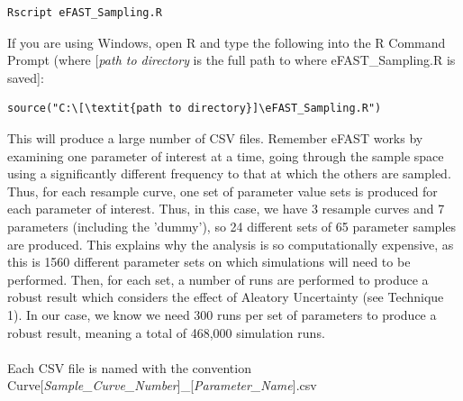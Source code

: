 \documentclass[a4paper,11pt]{article}
\begin{document}
\begin{enumerate}
\begin{verbatim}
Rscript eFAST_Sampling.R
\end{verbatim}

If you are using Windows, open R and type the following into the R Command Prompt (where [\textit{path to directory} is the full path to where eFAST\_Sampling.R is saved]:

\begin{verbatim}
source("C:\[\textit{path to directory}]\eFAST_Sampling.R")
\end{verbatim}

This will produce a large number of CSV files.  Remember eFAST works by examining one parameter of interest at a time, going through the sample space using a significantly different frequency to that at which the others are sampled. Thus, for each resample curve, one set of parameter value sets is produced for each parameter of interest. Thus, in this case, we have 3 resample curves and 7 parameters (including the 'dummy'), so 24 different sets of 65 parameter samples are produced. This explains why the analysis is so computationally expensive, as this is 1560 different parameter sets on which simulations will need to be performed. Then, for each set, a number of runs are performed to produce a robust result which considers the effect of Aleatory Uncertainty (see Technique 1).  In our case, we know we need 300 runs per set of parameters to produce a robust result, meaning a total of 468,000 simulation runs.\\
\\
Each CSV file is named with the convention Curve[\textit{Sample\_Curve\_Number}]\_[\textit{Parameter\_Name}].csv\\

\end{enumerate}
\end{document}
